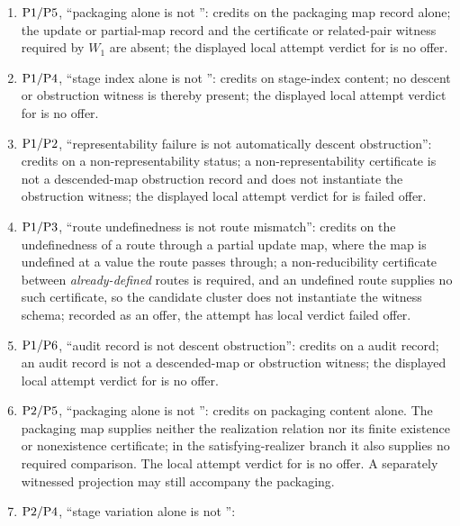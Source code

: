 \begin{enumerate}[topsep=2pt,itemsep=2pt,label=\textup{(\arabic*)}]
  \item \(\mathrm{P1}{}/\mathrm{P5}{}\), ``packaging alone is not \Pone{}'': credits
    \Pone{} on the \Pfive{} packaging map record alone; the update or partial-map record and the
    certificate or related-pair witness required by \(W_1\) are absent; the displayed local attempt verdict for \Pone{}
    is no offer.
  \item \(\mathrm{P1}{}/\mathrm{P4}{}\), ``stage index alone is not \Pone{}'': credits
    \Pone{} on \Pfour{} stage-index content; no descent or obstruction witness
    is thereby present; the displayed local attempt verdict for \Pone{} is no offer.
  \item \(\mathrm{P1}{}/\mathrm{P2}{}\), ``representability failure is not automatically
    descent obstruction'': credits \Pone{} on a \Ptwo{} non-representability
    status; a non-representability certificate is not a descended-map
    obstruction record and does not instantiate the \Pone{} obstruction
    witness; the displayed local attempt verdict for \Pone{} is failed offer.
  \item \(\mathrm{P1}{}/\mathrm{P3}{}\), ``route undefinedness is not route mismatch'':
    credits \Pthree{} on the undefinedness of a route through a partial update
    map, where the map is undefined at a value the route passes through; a
    non-reducibility certificate between \emph{already-defined} routes is
    required, and an undefined route supplies no such certificate, so the candidate cluster does
    not instantiate the \Pthree{} witness schema; recorded as an offer, the
    attempt has local verdict failed offer.
  \item \(\mathrm{P1}{}/\mathrm{P6}{}\), ``audit record is not descent obstruction'':
    credits \Pone{} on a \Psix{} audit record; an audit record is not a
    descended-map or obstruction witness; the displayed local attempt verdict for \Pone{} is
    no offer.
  \item \(\mathrm{P2}{}/\mathrm{P5}{}\), ``packaging alone is not \Ptwo{}'':
    credits \Ptwo{} on \Pfive{} packaging content alone. The packaging map
    supplies neither the realization relation nor its finite existence
    or nonexistence certificate; in the satisfying-realizer branch it also
    supplies no required comparison. The local attempt verdict for \Ptwo{}
    is no offer. A separately witnessed \Ptwo{} projection may still
    accompany the packaging.
  \item \(\mathrm{P2}{}/\mathrm{P4}{}\), ``stage variation alone is not \Ptwo{}'':

\end{enumerate}
